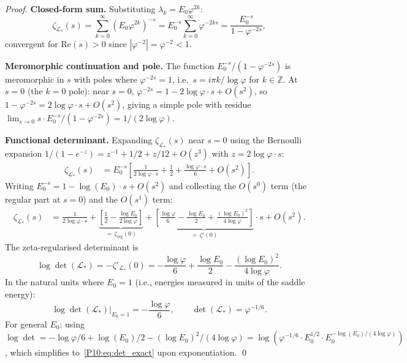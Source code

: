 \documentclass[11pt,a4paper]{article}
\theoremstyle{definition}
\theoremstyle{remark}
\newcommand{\vp}{\varphi}
\newcommand{\ZZ}{\mathbb{Z}}
\begin{document}
\begin{proof}
\textbf{Closed-form sum.}
Substituting $\lambda_k = E_0\vp^{2k}$:
\begin{equation}
  \zeta_{\mathcal{L}_*}(s)
  = \sum_{k=0}^{\infty}(E_0\vp^{2k})^{-s}
  = E_0^{-s}\sum_{k=0}^{\infty}\vp^{-2ks}
  = \frac{E_0^{-s}}{1-\vp^{-2s}},
  \label{P10:eq:zeta_derivation}
\end{equation}
convergent for $\mathrm{Re}(s)>0$ since $|\vp^{-2}| = \vp^{-2} < 1$.

\textbf{Meromorphic continuation and pole.}
The function $E_0^{-s}/(1-\vp^{-2s})$ is meromorphic in $s$ with poles
where $\vp^{-2s}=1$, i.e.\ $s = i\pi k/\log\vp$ for $k\in\ZZ$.
At $s=0$ (the $k=0$ pole): near $s=0$,
$\vp^{-2s} = 1 - 2\log\vp\cdot s + O(s^2)$, so
$1-\vp^{-2s} = 2\log\vp\cdot s + O(s^2)$, giving a simple pole with
residue $\lim_{s\to0} s\cdot E_0^{-s}/(1-\vp^{-2s})
= 1/(2\log\vp)$.

\textbf{Functional determinant.}
Expanding $\zeta_{\mathcal{L}_*}(s)$ near $s=0$ using the Bernoulli
expansion $1/(1-e^{-z}) = z^{-1} + 1/2 + z/12 + O(z^3)$
with $z = 2\log\vp\cdot s$:
\begin{align}
  \zeta_{\mathcal{L}_*}(s)
  &= E_0^{-s}\!\left[\frac{1}{2\log\vp\cdot s}
   + \frac{1}{2} + \frac{\log\vp\cdot s}{6} + O(s^2)\right].
  \label{P10:eq:zeta_laurent}
\end{align}
Writing $E_0^{-s} = 1 - \log(E_0)\cdot s + O(s^2)$ and collecting
the $O(s^0)$ term (the regular part at $s=0$) and the $O(s^1)$ term:
\begin{align}
  \zeta_{\mathcal{L}_*}(s)
  &= \frac{1}{2\log\vp\cdot s}
  + \underbrace{\!\left[\frac{1}{2} - \frac{\log E_0}{2\log\vp}\right]}_{=\,\zeta_\mathrm{reg}(0)}
  + \underbrace{\!\left[\frac{\log\vp}{6} - \frac{\log E_0}{2}
    + \frac{(\log E_0)^2}{4\log\vp}\right]}_{=\,\zeta'(0)}\!\cdot s
  + O(s^2).
  \label{P10:eq:zeta_coeffs}
\end{align}
The zeta-regularised determinant is
\begin{equation}
  \log\det(\mathcal{L}_*)
  = -\zeta'_{\mathcal{L}_*}(0)
  = -\frac{\log\vp}{6} + \frac{\log E_0}{2}
    - \frac{(\log E_0)^2}{4\log\vp}.
  \label{P10:eq:logdet}
\end{equation}
In the natural units where $E_0=1$ (i.e., energies measured in units
of the saddle energy):
\begin{equation}
  \log\det(\mathcal{L}_*)\big|_{E_0=1}
  = -\frac{\log\vp}{6},
  \qquad
  \boxed{\det(\mathcal{L}_*) = \vp^{-1/6}}.
  \label{P10:eq:det_E01}
\end{equation}
For general $E_0$: using $\log\det = -\log\vp/6 + \log(E_0)/2
- (\log E_0)^2/(4\log\vp) = \log(\vp^{-1/6}\cdot E_0^{1/2}
\cdot E_0^{-\log(E_0)/(4\log\vp)})$, which simplifies to~\eqref{P10:eq:det_exact}
upon exponentiation.
\qed
\end{proof}
\end{document}
